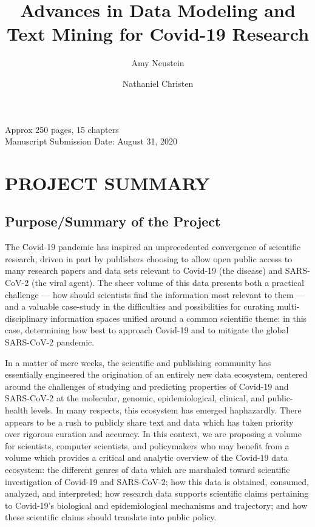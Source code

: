 \documentclass{statsoc}
\title[Data Modeling and Text Mining for Covid-19]{Advances in Data Modeling and Text Mining for Covid-19 Research}
\author[Amy Neustein]{Amy Neustein}
\author[Amy Neustein]{Nathaniel Christen}
\newcommand{\p}[1]{

\vspace{.75em}#1}
\begin{document}
\vspace{1em}
\noindent{}Approx 250 pages, 15 chapters\\
Manuscript Submission Date: August 31, 2020\\

{\fontsize{10}{14}\selectfont
\section{PROJECT SUMMARY}

\subsection{Purpose/Summary of the Project}
\p{The Covid-19 pandemic has inspired an unprecedented 
convergence of scientific research, driven in part 
by publishers choosing to allow open public access 
to many research papers and data sets 
relevant to Covid-19 (the disease) and SARS-CoV-2 
(the viral agent).  The sheer volume of this data 
presents both a practical challenge --- how should 
scientists find the information most relevant to them 
--- and a valuable case-study in the difficulties and 
possibilities for curating multi-disciplinary 
information spaces unified around a common 
scientific theme: in this case, 
determining how best to approach Covid-19 and to 
mitigate the global SARS-CoV-2 pandemic.}

\p{In a matter of mere weeks, the scientific and publishing 
community has essentially engineered the origination of 
an entirely new data ecosystem, centered around the 
challenges of studying and predicting properties 
of Covid-19 and SARS-CoV-2 at the molecular, genomic, 
epidemiological, clinical, and public-health levels.  
In many respects, this ecosystem has emerged 
haphazardly.  There appears to be a rush to publicly 
share text and data which has taken priority over 
rigorous curation and accuracy.  In this context, 
we are proposing a volume for scientists, computer 
scientists, and policymakers who may benefit from a 
volume which provides a critical and analytic 
overview of the Covid-19 data ecosystem: the 
different genres of data which are marshaled 
toward scientific investigation of Covid-19 
and SARS-CoV-2; how this data is obtained, 
consumed, analyzed, and interpreted; how 
research data supports scientific claims 
pertaining to Covid-19's biological and 
epidemiological mechanisms and trajectory; 
and how these scientific claims should 
translate into public policy.} 

}
\end{document}
